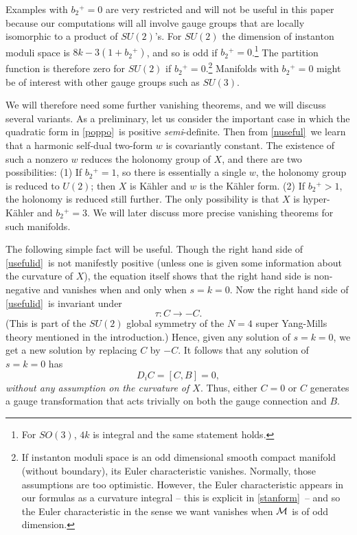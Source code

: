 \documentclass[12pt]{article}
\numberwithin{equation}{section}
\begin{document}
Examples with $b_2{}^+=0$ are very restricted and will not be useful
in this paper because our computations will all involve gauge groups that
are locally isomorphic to a product of $SU(2)$'s. For $SU(2)$ the dimension
of instanton moduli space is $8k-3(1+b_2{}^+)$, and so is odd if
$b_2{}^+=0$.\footnote{For $SO(3)$, $4k$ is integral and the same
statement holds.}  The partition function is therefore zero for $SU(2)$
if $b_2{}^+=0$.\footnote{If instanton moduli space is an odd
  dimensional smooth compact manifold (without boundary), its Euler
  characteristic vanishes. Normally, those assumptions are too
  optimistic.  However, the Euler characteristic appears in our
  formulas as a curvature integral -- this is explicit in
  \eqref{stanform}\ -- and so the Euler characteristic in the sense we
want vanishes when ${\cal M}$ is of odd dimension.}
Manifolds with $b_2{}^+=0$ might be of interest with
other gauge groups such as $SU(3)$.

We will therefore need some further vanishing theorems, and we will
discuss several variants.  As a preliminary, let us consider the important
case in which the quadratic form in \eqref{poppo}\ is positive {\it
semi}-definite.
Then  from \eqref{nuseful}\ we learn that a harmonic self-dual two-form
$w$ is covariantly constant.  The existence of such a nonzero $w$ reduces
the holonomy group of $X$, and there are two possibilities:
(1) If $b_2{}^+=1$, so there is essentially a single $w$, the holonomy
group is reduced to $U(2)$; then $X$ is K\"ahler and $w$ is the K\"ahler form.
(2) If $b_2{}^+>1$, the holonomy is reduced still further.  The only
possibility is that $X$ is hyper-K\"ahler and $b_2{}^+=3$.
We will later discuss more precise vanishing theorems for such manifolds.

The following simple fact will be useful.
Though the right hand side of \eqref{usefulid}\ is not manifestly positive
(unless one is given some information about the curvature of $X$),
the equation itself shows that the right hand side is non-negative and
vanishes when and only when $s=k=0$.  Now the right hand side of
\eqref{usefulid}\
is invariant under
\begin{equation}
  \label{funsym}
  \tau:C\to -C.
\end{equation}
(This is part of the $SU(2)$ global symmetry of the $N=4$ super
Yang-Mills theory mentioned in the introduction.)
Hence, given any solution of $s=k=0$, we get
a new solution by replacing $C$ by $-C$.  It follows that any solution
of $s=k=0$ has
\begin{equation}
  \label{unsym}
  D_iC=[C,B]=0,
\end{equation}
{\it without any assumption on the curvature of $X$}.
Thus, either $C=0$ or $C$ generates a gauge transformation that
acts trivially on both the gauge connection and $B$.
\end{document}
